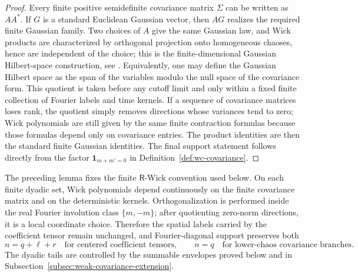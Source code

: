 \documentclass[10pt]{amsart}
\numberwithin{equation}{section}
\theoremstyle{plain}
\theoremstyle{definition}
\theoremstyle{remark}
\begin{document}
\begin{proof}
Every finite positive semidefinite covariance matrix \(\Sigma\) can be written as \(AA^*\).  If \(G\) is a standard Euclidean Gaussian vector, then \(AG\) realizes the required finite Gaussian family.  Two choices of \(A\) give the same Gaussian law, and Wick products are characterized by orthogonal projection onto homogeneous chaoses, hence are independent of the choice; this is the finite-dimensional Gaussian Hilbert-space construction, see \cite{Janson,Nualart}.  Equivalently, one may define the Gaussian Hilbert space as the span of the variables modulo the null space of the covariance form.  This quotient is taken before any cutoff limit and only within a fixed finite collection of Fourier labels and time kernels.  If a sequence of covariance matrices loses rank, the quotient simply removes directions whose variances tend to zero; Wick polynomials are still given by the same finite contraction formulas because those formulas depend only on covariance entries.  The product identities are then the standard finite Gaussian identities.  The final support statement follows directly from the factor \(\mathbf 1_{m+m'=0}\) in Definition~\ref{def:wc-covariance}.
\end{proof}

The preceding lemma fixes the finite \(\mathsf R\)-Wick convention used below.  On each finite dyadic set, Wick polynomials depend continuously on the finite covariance matrix and on the deterministic kernels.  Orthogonalization is performed inside the real Fourier involution class \(\{m,-m\}\); after quotienting zero-norm directions, it is a local coordinate choice.  Therefore the spatial labels carried by the coefficient tensor remain unchanged, and Fourier-diagonal support preserves both
\[
        n=q+\ell+r \quad\text{for centered coefficient tensors},
        \qquad
        n=q \quad\text{for lower-chaos covariance branches}.
\]
The dyadic tails are controlled by the summable envelopes proved below and in Subsection~\ref{subsec:weak-covariance-extension}.
\end{document}
